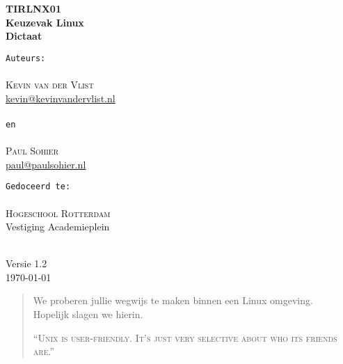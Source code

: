 \documentclass[a4paper,11pt]{report}
\begin{document}
\begin{titlepage}
\vspace*{\fill}
\begin{center}

\textsc{\Huge \bfseries TIRLNX01}\\[0.5cm]
{\large \bfseries Keuzevak Linux}\\[0.25cm]
{\large \bfseries Dictaat}\\[1.5cm]

\begin{minipage}{0.4\textwidth}
\begin{flushleft} \large
\texttt{Auteurs:}\\
\ \\
\textsc{Kevin van der Vlist}\\
\href{mailto:kevin@kevinvandervlist.nl}{kevin@kevinvandervlist.nl}\\
\ \\
\texttt{en}\\
\ \\
\textsc{Paul Sohier}\\
\href{mailto:paul@paulsohier.nl}{paul@paulsohier.nl}
\end{flushleft}
\end{minipage}
\begin{minipage}{0.5\textwidth}

\begin{flushright} \large
\texttt{Gedoceerd te:}\\
\ \\
\textsc{Hogeschool Rotterdam}\\
Vestiging Academieplein
\end{flushright}
\end{minipage}
{\ }\\[1.5cm]
{\large Versie 1.2}\\[0.75cm]
{\large \today}
\vfill
\end{center}
\vspace*{\fill}
\end{titlepage}

\begin{abstract}\centering
We proberen jullie wegwijs te maken binnen een Linux omgeving.\\
Hopelijk slagen we hierin.

\textsc{``Unix is user-friendly. It's just very selective about who its friends are.''}
\end{abstract}

{}
\end{document}
